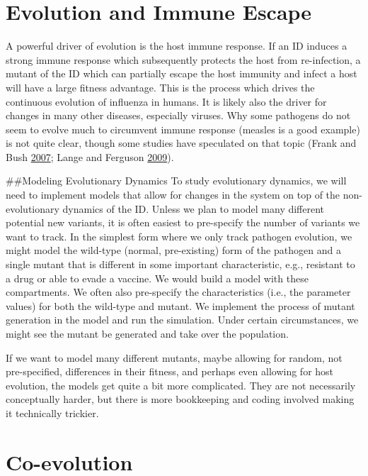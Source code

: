 \documentclass[]{book}
\theoremstyle{definition}
\theoremstyle{definition}
\theoremstyle{definition}
\theoremstyle{remark}
\begin{document}
\hypertarget{evolution-and-immune-escape}{%
\section{Evolution and Immune
Escape}\label{evolution-and-immune-escape}}

A powerful driver of evolution is the host immune response. If an ID
induces a strong immune response which subsequently protects the host
from re-infection, a mutant of the ID which can partially escape the
host immunity and infect a host will have a large fitness advantage.
This is the process which drives the continuous evolution of influenza
in humans. It is likely also the driver for changes in many other
diseases, especially viruses. Why some pathogens do not seem to evolve
much to circumvent immune response (measles is a good example) is not
quite clear, though some studies have speculated on that topic (Frank
and Bush \protect\hyperlink{ref-frank07}{2007}; Lange and Ferguson
\protect\hyperlink{ref-lange09}{2009}).

\#\#Modeling Evolutionary Dynamics To study evolutionary dynamics, we
will need to implement models that allow for changes in the system on
top of the non-evolutionary dynamics of the ID. Unless we plan to model
many different potential new variants, it is often easiest to
pre-specify the number of variants we want to track. In the simplest
form where we only track pathogen evolution, we might model the
wild-type (normal, pre-existing) form of the pathogen and a single
mutant that is different in some important characteristic, e.g.,
resistant to a drug or able to evade a vaccine. We would build a model
with these compartments. We often also pre-specify the characteristics
(i.e., the parameter values) for both the wild-type and mutant. We
implement the process of mutant generation in the model and run the
simulation. Under certain circumstances, we might see the mutant be
generated and take over the population.

If we want to model many different mutants, maybe allowing for random,
not pre-specified, differences in their fitness, and perhaps even
allowing for host evolution, the models get quite a bit more
complicated. They are not necessarily conceptually harder, but there is
more bookkeeping and coding involved making it technically trickier.

\hypertarget{co-evolution}{%
\section{Co-evolution}\label{co-evolution}}
\end{document}
